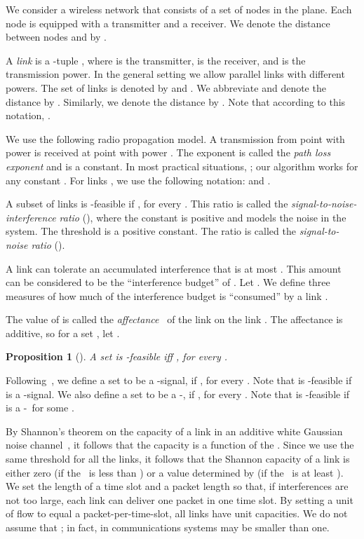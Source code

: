 \documentclass[11pt]{article}
\newenvironment{proof sketch}{\noindent {\bf Proof sketch:} }{\hfill \qed}
\newtheorem{proposition}{Proposition}
\newcommand{\sinr}{\text{\sc{sinr}}}
\newcommand{\snr}{\text{\sc{snr}}}
\newcommand{\barsignal}{}
\begin{document}
We consider a wireless network that consists of a set  of  nodes in the plane.
Each node is equipped with a transmitter and a receiver.
We denote the distance between nodes  and  by .

A \emph{link} is a -tuple , where  is the
transmitter,  is the receiver, and  is the transmission power.
In the general setting we allow parallel links with different powers.
The set of links is denoted by  and .
We abbreviate and denote the distance  by .
Similarly, we denote the distance  by .
Note that according to this notation, .

We use the following radio propagation model.  A transmission from
point  with power  is received at point  with power
.  The exponent  is called the \emph{path
  loss exponent} and is a constant.
  In most practical
situations, ; our algorithm works for any constant .
For links , we use the
following notation:  and
.

A subset of links  is \sinr-feasible if
, for every .
This ratio is called the \emph{signal-to-noise-interference ratio}
(\sinr), where the constant  is positive and models the noise in
the system.  The threshold  is a positive constant. The ratio
 is called the \emph{signal-to-noise ratio} (\snr).

A link  can tolerate an accumulated interference  that is at most
.  This amount can be considered to be the
``interference budget'' of .  Let .
We define three measures of how much of the interference budget is ``consumed'' by a link .

The value of  is called the \emph{affectance}~\cite{HW} of the link
 on the link . The affectance is additive, so
for a set , let .
\begin{proposition}[\cite{HW}]
  A set  is \sinr-feasible iff , for every .
\end{proposition}

Following~\cite{HW}, we define a set  to be a
-signal, if , for every . Note that  is
\sinr-feasible if  is a -signal.
We also define a set  to be a
-\barsignal, if , for every . Note that  is
\sinr-feasible if  is a -\barsignal\ for some .

By Shannon's theorem on the capacity of a link in an additive white
Gaussian noise channel~\cite{gallager1968information}, it follows that the capacity
is a function of the \sinr. Since we use the same threshold 
for all the links, it follows that
the Shannon capacity of a link is either zero (if the \sinr\ is less than )
or a value determined by  (if the \sinr\ is at least ).
We set the length of a time slot and a packet length so that, if
interferences are not too large, each link can deliver one packet in one
time slot.  By setting a unit of flow to equal a packet-per-time-slot, all
links have unit capacities.
We do not assume that ; in fact,
in communications systems  may be smaller than one.
\end{document}
